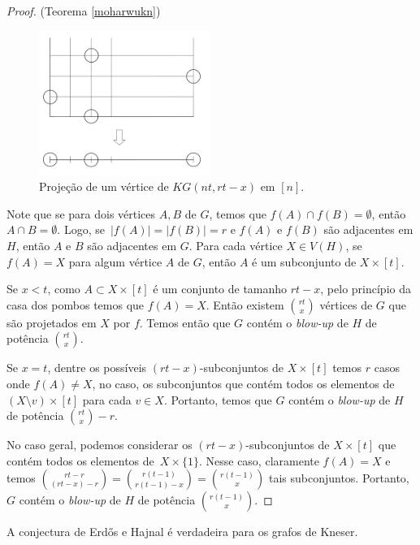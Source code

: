 \begin{proof}{(Teorema \ref{moharwukn})}
\begin{figure}[H]
\centering
\includegraphics[width=0.5\textwidth]{figuras/ch_kneser/kneser-projection.png}
\caption{Projeção de um vértice de $KG(nt,rt-x)$ em $[n]$.}
\label{fig:kneserprojection}
\end{figure}

Note que se para dois vértices $A,B$ de $G$, temos que $f(A)\cap f(B) = \emptyset$, então $A\cap B = \emptyset$. Logo, se~$|f(A)| = |f(B)| = r$ e $f(A)$ e $f(B)$ são adjacentes em $H$, então $A$ e $B$ são adjacentes em $G$. Para cada vértice $X\in V(H)$, se $f(A) = X$ para algum vértice $A$ de $G$, então $A$ é um subconjunto de $X \times [t]$.

Se $x<t$, como $A \subset X \times [t]$ é um conjunto de tamanho $rt-x$, pelo princípio da casa dos pombos temos que $f(A) = X$. Então existem $\binom{rt}{x}$ vértices de $G$ que são projetados em $X$ por $f$. Temos então que $G$ contém o \textit{blow-up} de $H$ de potência $\binom{rt}{x}$.

Se $x=t$, dentre os possíveis $(rt-x)$-subconjuntos de $X \times [t]$ temos $r$ casos onde $f(A) \neq X$, no caso, os subconjuntos que contém todos os elementos de $(X\setminus v) \times [t]$ para cada $v\in X$. Portanto, temos que $G$ contém o \textit{blow-up} de $H$ de potência $\binom{rt}{x}-r$.

No caso geral, podemos considerar os $(rt-x)$-subconjuntos de $X\times [t]$ que contém todos os elementos de~$X \times \{1\}$. Nesse caso, claramente $f(A) = X$ e temos $\binom{rt-r}{(rt-x)-r} = \binom{r(t-1)}{r(t-1)-x} = \binom{r(t-1)}{x}$ tais subconjuntos. Portanto, $G$ contém o \textit{blow-up} de $H$ de potência $\binom{r(t-1)}{x}$.
\end{proof}

\begin{corolario}\label{knesercor}
A conjectura de Erd\H{o}s e Hajnal é verdadeira para os grafos de Kneser.
\end{corolario}


